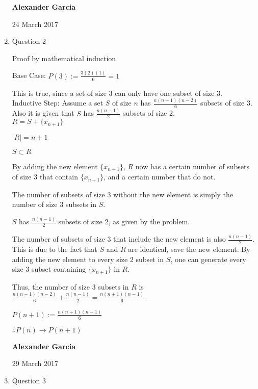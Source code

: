 \documentclass[11pt]{article}
\begin{document}
\begin{enumerate}
\begin{enumerate}[(a)]
		\end{enumerate}

		\newpage

		\textbf{Alexander Garcia}

		24 March 2017 \\

	\item Question 2

		Proof by mathematical induction

		Base Case: $P(3) := \frac{3(2)(1)}{6} = 1$

		This is true, since a set of size 3 can only have
		one subset of size 3. \\

		Inductive Step: Assume a set $S$ of size $n$ has
		$\frac{n(n-1)(n-2)}{6}$ subsets of size 3. Also
		it is given that $S$ has $\frac{n(n-1)}{2}$ subsets
		of size 2. \\

		$R = S + \{x_{n+1}\}$

		$|R| = n+1$

		$S \subset R$

		By adding the new element $\{x_{n+1}\}$, $R$ now
		has a certain number of subsets of size 3 that
		contain $\{x_{n+1}\}$, and a certain number that do
		not.

		The number of subsets of size 3 without the new
		element is simply the number of size 3 subsets in
		$S$.

		$S$ has $\frac{n(n-1)}{2}$ subsets of size 2, as
		given by the problem.

		The number of subsets of size 3 that include the
		new element is also $\frac{n(n-1)}{2}$. This is due
		to the fact that $S$ and $R$ are identical, save
		the new element. By adding the new element to every
		size 2 subset in $S$, one can generate every size
		3 subset containing $\{x_{n+1}\}$ in $R$.

		Thus, the number of size 3 subsets in $R$ is
		$\frac{n(n-1)(n-2)}{6} + \frac{n(n-1)}{2} =
		\frac{n(n+1)(n-1)}{6}$

		$P(n+1):=\frac{n(n+1)(n-1)}{6}$

		$\therefore P(n) \rightarrow P(n+1)$

		\newpage

		\textbf{Alexander Garcia}

		29 March 2017 \\

	\item Question 3


\end{enumerate}
\end{document}

